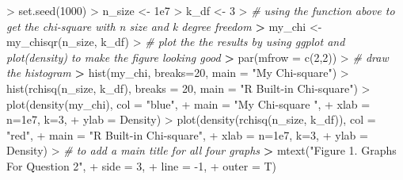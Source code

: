 \documentclass[
]{article}
\newenvironment{Shaded}{\begin{snugshade}}{\end{snugshade}}
\newcommand{\AttributeTok}[1]{\textcolor[rgb]{0.77,0.63,0.00}{#1}}
\newcommand{\CommentTok}[1]{\textcolor[rgb]{0.56,0.35,0.01}{\textit{#1}}}
\newcommand{\DecValTok}[1]{\textcolor[rgb]{0.00,0.00,0.81}{#1}}
\newcommand{\ErrorTok}[1]{\textcolor[rgb]{0.64,0.00,0.00}{\textbf{#1}}}
\newcommand{\FloatTok}[1]{\textcolor[rgb]{0.00,0.00,0.81}{#1}}
\newcommand{\FunctionTok}[1]{\textcolor[rgb]{0.00,0.00,0.00}{#1}}
\newcommand{\NormalTok}[1]{#1}
\newcommand{\OtherTok}[1]{\textcolor[rgb]{0.56,0.35,0.01}{#1}}
\newcommand{\SpecialCharTok}[1]{\textcolor[rgb]{0.00,0.00,0.00}{#1}}
\newcommand{\StringTok}[1]{\textcolor[rgb]{0.31,0.60,0.02}{#1}}
\begin{document}
\begin{Shaded}
\begin{Highlighting}[]
\SpecialCharTok{\textgreater{}} \FunctionTok{set.seed}\NormalTok{(}\DecValTok{1000}\NormalTok{)}
\SpecialCharTok{\textgreater{}}\NormalTok{ n\_size }\OtherTok{\textless{}{-}} \FloatTok{1e7}
\SpecialCharTok{\textgreater{}}\NormalTok{ k\_df }\OtherTok{\textless{}{-}} \DecValTok{3}
\SpecialCharTok{\textgreater{}} \CommentTok{\# using the function above to get the chi{-}square with n size and k degree freedom}
\ErrorTok{\textgreater{}}\NormalTok{ my\_chi }\OtherTok{\textless{}{-}} \FunctionTok{my\_chisqr}\NormalTok{(n\_size, k\_df)}
\SpecialCharTok{\textgreater{}} \CommentTok{\# plot the the results by using ggplot and plot(density) to make the figure looking good}
\ErrorTok{\textgreater{}} \FunctionTok{par}\NormalTok{(}\AttributeTok{mfrow =} \FunctionTok{c}\NormalTok{(}\DecValTok{2}\NormalTok{,}\DecValTok{2}\NormalTok{))}
\SpecialCharTok{\textgreater{}} \CommentTok{\# draw the histogram}
\ErrorTok{\textgreater{}} \FunctionTok{hist}\NormalTok{(my\_chi, }\AttributeTok{breaks=}\DecValTok{20}\NormalTok{, }\AttributeTok{main =} \StringTok{"My Chi{-}square"}\NormalTok{)}
\SpecialCharTok{\textgreater{}} \FunctionTok{hist}\NormalTok{(}\FunctionTok{rchisq}\NormalTok{(n\_size, k\_df), }\AttributeTok{breaks =} \DecValTok{20}\NormalTok{, }\AttributeTok{main =} \StringTok{"R Built{-}in Chi{-}square"}\NormalTok{)}
\SpecialCharTok{\textgreater{}} \FunctionTok{plot}\NormalTok{(}\FunctionTok{density}\NormalTok{(my\_chi), }\AttributeTok{col =} \StringTok{"blue"}\NormalTok{,}
\SpecialCharTok{+}      \AttributeTok{main =} \StringTok{"My Chi{-}square "}\NormalTok{,}
\SpecialCharTok{+}      \AttributeTok{xlab =} \StringTok{\textquotesingle{}n=1e7, k=3\textquotesingle{}}\NormalTok{,}
\SpecialCharTok{+}      \AttributeTok{ylab =} \StringTok{\textquotesingle{}Density\textquotesingle{}}\NormalTok{)}
\SpecialCharTok{\textgreater{}} \FunctionTok{plot}\NormalTok{(}\FunctionTok{density}\NormalTok{(}\FunctionTok{rchisq}\NormalTok{(n\_size, k\_df)), }\AttributeTok{col =} \StringTok{"red"}\NormalTok{,}
\SpecialCharTok{+}      \AttributeTok{main =} \StringTok{"R Built{-}in Chi{-}square"}\NormalTok{,}
\SpecialCharTok{+}      \AttributeTok{xlab =} \StringTok{\textquotesingle{}n=1e7, k=3\textquotesingle{}}\NormalTok{,}
\SpecialCharTok{+}      \AttributeTok{ylab =} \StringTok{\textquotesingle{}Density\textquotesingle{}}\NormalTok{)}
\SpecialCharTok{\textgreater{}} \CommentTok{\# to add a main title for all four graphs}
\ErrorTok{\textgreater{}} \FunctionTok{mtext}\NormalTok{(}\StringTok{"Figure 1. Graphs For Question 2"}\NormalTok{,}
\SpecialCharTok{+}       \AttributeTok{side =} \DecValTok{3}\NormalTok{,}
\SpecialCharTok{+}       \AttributeTok{line =} \SpecialCharTok{{-}}\DecValTok{1}\NormalTok{,}
\SpecialCharTok{+}       \AttributeTok{outer =}\NormalTok{ T)}
\end{Highlighting}
\end{Shaded}
\end{document}
